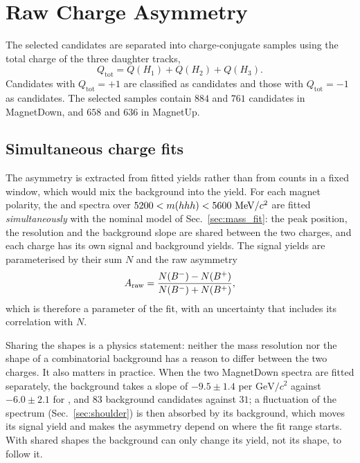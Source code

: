 \section{Raw Charge Asymmetry}
\label{sec:cp}

The selected candidates are separated into charge-conjugate samples using the
total charge of the three daughter tracks,
\begin{equation}
  Q_{\mathrm{tot}} = Q(H_1) + Q(H_2) + Q(H_3).
\end{equation}
Candidates with $Q_{\mathrm{tot}}=+1$ are classified as \Bplus{} candidates and
those with $Q_{\mathrm{tot}}=-1$ as \Bminus{} candidates. The selected samples
contain $884$ \Bplus{} and $761$ \Bminus{} candidates in MagnetDown, and $658$ and
$636$ in MagnetUp.

\subsection{Simultaneous charge fits}

The asymmetry is extracted from fitted yields rather than from counts in a fixed
window, which would mix the background into the yield. For each magnet polarity,
the \Bplus{} and \Bminus{} spectra over $5200 < m(hhh) < 5600~\mathrm{MeV}/c^2$ are fitted
\emph{simultaneously} with the nominal model of Sec.~\ref{sec:mass_fit}: the peak
position, the resolution and the background slope are shared between the two
charges, and each charge has its own signal and background yields. The signal
yields are parameterised by their sum $N$ and the raw asymmetry
\begin{equation}
  A_{\mathrm{raw}} =
  \frac{N(B^-)-N(B^+)}
       {N(B^-)+N(B^+)} ,
  \label{eq:raw_asymmetry_fit}
\end{equation}
which is therefore a parameter of the fit, with an uncertainty that includes its
correlation with $N$.

Sharing the shapes is a physics statement: neither the mass resolution nor the
shape of a combinatorial background has a reason to differ between the two
charges. It also matters in practice. When the two MagnetDown spectra are fitted
separately, the \Bplus{} background takes a slope of $-9.5 \pm 1.4$ per
$\mathrm{GeV}/c^2$ against $-6.0 \pm 2.1$ for \Bminus{}, and $83$ background
candidates against $31$; a fluctuation of the \Bplus{} spectrum
(Sec.~\ref{sec:shoulder}) is then absorbed by its background, which moves its
signal yield and makes the asymmetry depend on where the fit range starts. With
shared shapes the background can only change its yield, not its shape, to follow
it.

